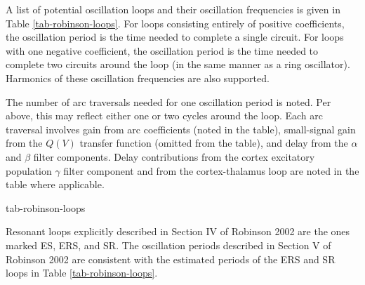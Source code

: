A list of potential oscillation loops and their oscillation frequencies is
given in Table \ref{tab-robinson-loops}. For loops consisting entirely of
positive coefficients, the oscillation period is the time needed to complete
a single circuit. For loops with one negative coefficient, the oscillation
period is the time needed to complete two circuits around the loop (in the
same manner as a ring oscillator). Harmonics of these oscillation frequencies
are also supported.

The number of arc traversals needed for one oscillation period is noted.
Per above, this may reflect either one or two cycles around the loop. Each
arc traversal involves gain from arc coefficients (noted in the table),
small-signal gain from the $Q(V)$ transfer function (omitted from the table),
and delay from the $\alpha$ and $\beta$ filter components. Delay
contributions from the cortex excitatory population $\gamma$ filter
component and from the cortex-thalamus loop are noted in the table where
applicable.

{tab-robinson-loops}

Resonant loops explicitly described in Section IV of Robinson 2002 are the
ones marked ES, ERS, and SR. The oscillation periods described in Section
V of Robinson 2002 are consistent with the estimated periods of the ERS and
SR loops in Table \ref{tab-robinson-loops}.


